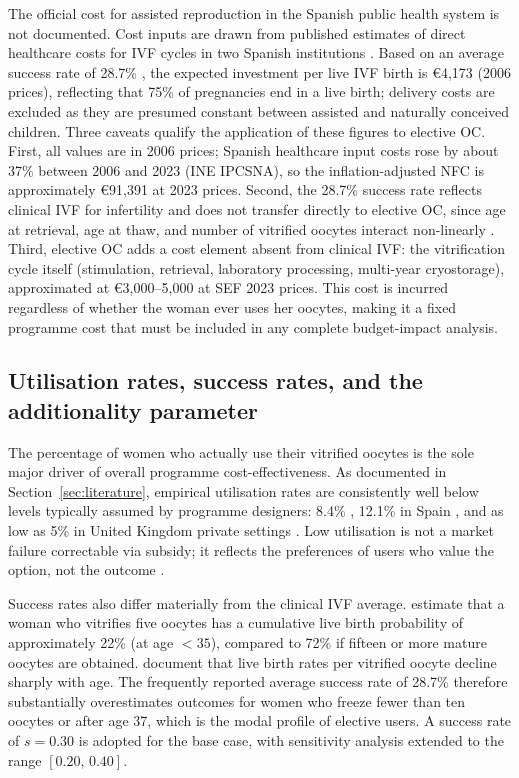 \documentclass[12pt,a4paper]{article}
\begin{document}
The official cost for assisted reproduction in the Spanish public
health system is not documented. Cost inputs are drawn from published
estimates of direct healthcare costs for IVF cycles in two Spanish
institutions \citep{matorrasweinig2011,matorras2001,navarro2006}. Based
on an average success rate of 28.7\% \citep{sef2001}, the expected
investment per live IVF birth is \euro{}4,173 (2006 prices), reflecting
that 75\% of pregnancies end in a live birth; delivery costs are
excluded as they are presumed constant between assisted and naturally
conceived children. Three caveats qualify the application of these
figures to elective OC. First, all \citet{matorras2016} values are in
2006 prices; Spanish healthcare input costs rose by about 37\% between
2006 and 2023 (INE IPCSNA), so the inflation-adjusted NFC is
approximately \euro{}91,391 at 2023 prices. Second, the 28.7\% success
rate reflects clinical IVF for infertility and does not transfer
directly to elective OC, since age at retrieval, age at thaw, and
number of vitrified oocytes interact non-linearly
\citep{cobo2016,chronopoulou2021}. Third, elective OC adds a cost
element absent from clinical IVF: the vitrification cycle itself
(stimulation, retrieval, laboratory processing, multi-year
cryostorage), approximated at \euro{}3,000--5,000 at SEF 2023 prices.
This cost is incurred regardless of whether the woman ever uses her
oocytes, making it a fixed programme cost that must be included in any
complete budget-impact analysis.

\subsection{Utilisation rates, success rates, and the additionality
parameter}\label{sec:parameters}

The percentage of women who actually use their vitrified oocytes is
the sole major driver of overall programme cost-effectiveness. As
documented in Section~\ref{sec:literature}, empirical utilisation rates
are consistently well below levels typically assumed by programme
designers: 8.4\% \citep{yang2022}, 12.1\% in Spain
\citep{cobo2018}, and as low as 5\% in United Kingdom private settings
\citep{trokoudes2011}. Low utilisation is not a market failure
correctable via subsidy; it reflects the preferences of users who
value the option, not the outcome \citep{kynigopoulou2024}.

Success rates also differ materially from the clinical IVF average.
\citet{cobo2016} estimate that a woman who vitrifies five oocytes has a
cumulative live birth probability of approximately 22\% (at age
$< 35$), compared to 72\% if fifteen or more mature oocytes are
obtained. \citet{chronopoulou2021} document that live birth rates per
vitrified oocyte decline sharply with age. The frequently reported
average success rate of 28.7\% therefore substantially overestimates
outcomes for women who freeze fewer than ten oocytes or after age 37,
which is the modal profile of elective users. A success rate of
$s = 0.30$ is adopted for the base case, with sensitivity analysis
extended to the range $[0.20,\,0.40]$.
\end{document}
